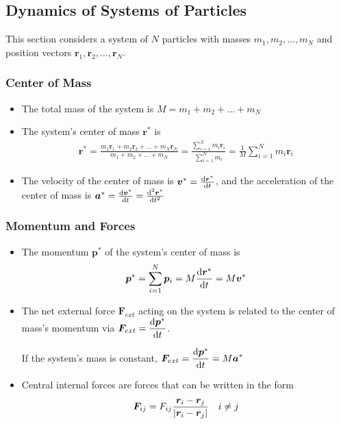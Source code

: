 \documentclass[11pt, a4paper]{article}
\begin{document}
\subsection{Dynamics of Systems of Particles} \label{subsec:newton_many_particles}

This section considers a system of $ N $ particles with masses $ m_1, m_2, \dots, m_N$ and position vectors $ \bm{r}_1, \bm{r}_2, \dots, \bm{r}_{N} $.

\subsubsection{Center of Mass}

\begin{itemize}
	\item The total mass of the system is $ M =  m_1 + m_2 + \dots + m_N$
	
	\item The system's center of mass $ \bm{r}^* $ is
	\begin{align*}	
		\bm{r}^* = \frac{m_1 \bm{r}_1 + m_2 \bm{r}_2 + \dots + m_N \bm{r}_N }{m_1 + m_2 + \dots + m_N} = \frac{\sum_{i = 1}^{N} m_i \bm{r}_i}{\sum_{i = 1}^{N} m_i} =  \frac{1}{M} \sum_{i = 1}^{N} m_i \bm{r}_i
	\end{align*}
	
	\item The velocity of the center of mass is $ \bm{v}^* = \dv{\bm{r}^*}{t} $, and the acceleration of the center of mass is $ \bm{a}^* = \dv{\bm{v}^*}{t} = \dv[2]{\bm{r}^*}{t}$
	
\end{itemize}

\subsubsection{Momentum and Forces}
\begin{itemize}
	\item The momentum $ \bm{p}^* $ of the system's center of mass is
	\begin{align*}
		\bm{p}^* = \sum_{i = 1}^{N} \bm{p}_i = M \dv{\bm{r}^*}{t} = M \bm{v}^*
	\end{align*}
	
	\item The net external force $ \bm{F}_{ext} $ acting on the system is related to the center of mass's momentum via $ \displaystyle{\bm{F}_{ext} = \dv{\bm{p}^*}{t}} $. 
	
	If the system's mass is constant, $ \displaystyle{\bm{F}_{ext} = \dv{\bm{p}^*}{t} = M \bm{a}^*} $
	
	\item Central internal forces are forces that can be written in the form
	\begin{align*}
		\bm{F}_{ij} = F_{ij}\frac{\bm{r}_{i} - \bm{r}_{j}}{\abs{\bm{r}_{i} - \bm{r}_{j}}} \quad i \neq j
	\end{align*}

\end{itemize}
\end{document}
